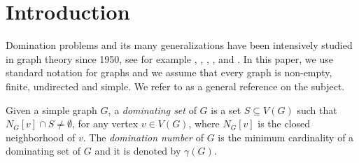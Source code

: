 \documentclass[a4paper,12pt, reqno]{amsart}
\newtheorem{Definition}[Theorem]{Definition}
\DeclareMathOperator{\diam}{diam}
\begin{document}
\section{\bf Introduction}

Domination problems and its many generalizations have been intensively studied in graph theory since 1950, see for example \cite{HHS5}, \cite{HHS6}, \cite{HeYe13}, \cite{farsom},  \cite{3totdominrook} and \cite{dominLatin}. In this paper, we use standard notation for graphs and we assume that every graph is non-empty, finite, undirected and simple. We refer to \cite{bondy2008graph} as a general reference on the subject.



Given a simple graph $G$, a \emph{dominating set} of $G$ is a set $S\subseteq V(G)$
such that  $N_G[v]\cap
S\neq \emptyset$, for any vertex $v\in V(G)$, where $N_G[v]$ is the closed neighborhood of $v$. The \emph{domination number} of $G$ is the minimum cardinality of a dominating set of $G$ and it is denoted by $\gamma(G)$. %
\end{document}
